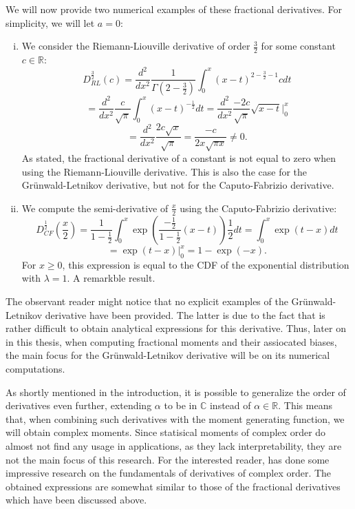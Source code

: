 We will now provide two numerical examples of these fractional derivatives. For simplicity, we will let \(a = 0\):
\begin{example}
    \begin{enumerate}[(i)]
        \item 
    
    We consider the Riemann-Liouville derivative of order \(\frac{3}{2}\) for some constant \(c \in \mathbb{R}\):
    \[D^{\frac{3}{2}}_{RL}(c) = \frac{d^2}{dx^2} \frac{1}{\Gamma(2 - \frac{3}{2})}  \int_{0}^{x} (x-t)^{2 - \frac{3}{2}-1} c dt\]
    \[= \frac{d^2}{dx^2} \frac{c}{\sqrt{\pi}}  \int_{0}^{x} (x-t)^{- \frac{1}{2}} dt = \frac{d^2}{dx^2} \frac{-2c}{\sqrt{\pi}} \sqrt{x - t} \Big|_{0}^{x}\]
    \[= \frac{d^2}{dx^2} \frac{2c \sqrt{x}}{\sqrt{\pi}} = \frac{-c}{2x\sqrt{\pi x}} \neq 0.\] As stated, the fractional derivative of a constant is not equal to zero when using the Riemann-Liouville derivative. This is also the case for the Grünwald-Letnikov derivative, but not for the Caputo-Fabrizio derivative.
    \item We compute the semi-derivative of \(\frac{x}{2}\) using the Caputo-Fabrizio derivative:
    \[D^{\frac{1}{2}}_{CF}\left(\frac{x}{2}\right) = \frac{1}{1 - \frac{1}{2}}  \int_{0}^{x} \exp\left(\frac{-\frac{1}{2}}{1 - \frac{1}{2}}(x-t)\right) \frac{1}{2} dt = \int_{0}^{x} \exp(t - x) dt\]
    \[ =  \exp(t - x) \Big|_{0}^{x} = 1 - \exp(- x).\]
    For \(x \geq 0\), this expression is equal to the CDF of the exponential distribution with \(\lambda = 1\). A remarkble result.
    
    \end{enumerate}
\end{example}
The observant reader might notice that no explicit examples of the Grünwald-Letnikov derivative have been provided. The latter is due to the fact that is rather difficult to obtain analytical expressions for this derivative. Thus, later on in this thesis, when computing fractional moments and their assiocated biases, the main focus for the Grünwald-Letnikov derivative will be on its numerical computations.
\begin{remark}
    
As shortly mentioned in the introduction, it is possible to generalize the order of derivatives even further, extending \(\alpha\) to be in \(\mathbb{C}\) instead of \(\alpha \in \mathbb{R}\). This means that, when combining such derivatives with the moment generating function, we will obtain complex moments. Since statisical moments of complex order do almost not find any usage in applications, as they lack interpretability, they are not the main focus of this research. For the interested reader, \cite{love1971} has done some impressive research on the fundamentals of derivatives of complex order. The obtained expressions are somewhat similar to those of the fractional derivatives which have been discussed above.
\end{remark}